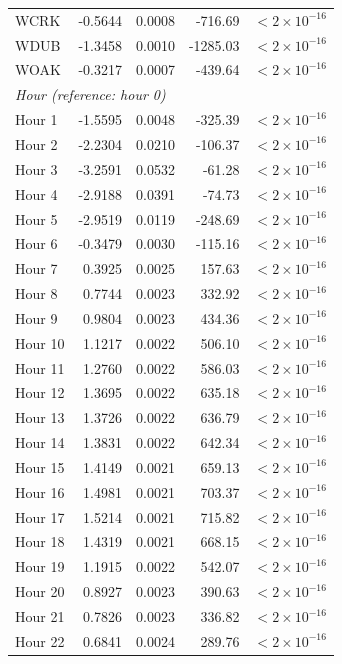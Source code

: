 \documentclass[11pt, letterpaper]{article}
\begin{document}
\begin{longtable}{lrrrr}
WCRK  & -0.5644 & 0.0008 &  -716.69 & $<2\times10^{-16}$ \\
WDUB  & -1.3458 & 0.0010 & -1285.03 & $<2\times10^{-16}$ \\
WOAK  & -0.3217 & 0.0007 &  -439.64 & $<2\times10^{-16}$ \\
\hline
\multicolumn{5}{l}{\textit{Hour (reference: hour 0)}} \\
Hour 1  & -1.5595 & 0.0048 &  -325.39 & $<2\times10^{-16}$ \\
Hour 2  & -2.2304 & 0.0210 &  -106.37 & $<2\times10^{-16}$ \\
Hour 3  & -3.2591 & 0.0532 &   -61.28 & $<2\times10^{-16}$ \\
Hour 4  & -2.9188 & 0.0391 &   -74.73 & $<2\times10^{-16}$ \\
Hour 5  & -2.9519 & 0.0119 &  -248.69 & $<2\times10^{-16}$ \\
Hour 6  & -0.3479 & 0.0030 &  -115.16 & $<2\times10^{-16}$ \\
Hour 7  &  0.3925 & 0.0025 &   157.63 & $<2\times10^{-16}$ \\
Hour 8  &  0.7744 & 0.0023 &   332.92 & $<2\times10^{-16}$ \\
Hour 9  &  0.9804 & 0.0023 &   434.36 & $<2\times10^{-16}$ \\
Hour 10 &  1.1217 & 0.0022 &   506.10 & $<2\times10^{-16}$ \\
Hour 11 &  1.2760 & 0.0022 &   586.03 & $<2\times10^{-16}$ \\
Hour 12 &  1.3695 & 0.0022 &   635.18 & $<2\times10^{-16}$ \\
Hour 13 &  1.3726 & 0.0022 &   636.79 & $<2\times10^{-16}$ \\
Hour 14 &  1.3831 & 0.0022 &   642.34 & $<2\times10^{-16}$ \\
Hour 15 &  1.4149 & 0.0021 &   659.13 & $<2\times10^{-16}$ \\
Hour 16 &  1.4981 & 0.0021 &   703.37 & $<2\times10^{-16}$ \\
Hour 17 &  1.5214 & 0.0021 &   715.82 & $<2\times10^{-16}$ \\
Hour 18 &  1.4319 & 0.0021 &   668.15 & $<2\times10^{-16}$ \\
Hour 19 &  1.1915 & 0.0022 &   542.07 & $<2\times10^{-16}$ \\
Hour 20 &  0.8927 & 0.0023 &   390.63 & $<2\times10^{-16}$ \\
Hour 21 &  0.7826 & 0.0023 &   336.82 & $<2\times10^{-16}$ \\
Hour 22 &  0.6841 & 0.0024 &   289.76 & $<2\times10^{-16}$ \\

\end{longtable}
\end{document}
